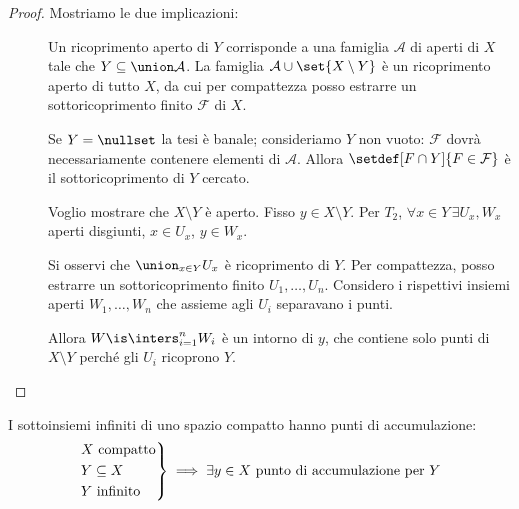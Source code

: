 \begin{proof}
Mostriamo le due implicazioni:
\begin{description}
	\item[\proofleftarrow]
		Un ricoprimento aperto di $Y$ corrisponde a una famiglia  $\mathcal A$ di aperti di $X$ tale che $Y\subseteq \union\mathcal A$.
  La famiglia $\mathcal A \cup \set{X\setminus Y}$ è un ricoprimento aperto di tutto $X$,
		da cui per compattezza posso estrarre un sottoricoprimento finito $\mathcal F$ di $X$.
  
  Se $Y=\nullset$ la tesi è banale; consideriamo $Y$ non vuoto:
  $\mathcal F$ dovrà necessariamente contenere elementi di $\mathcal A$.
  Allora $\setdef[F\cap Y]{F\in\mathcal F}$ è il sottoricoprimento di $Y$ cercato.\footnotemark
 \item[\proofrightarrow]
		Voglio mostrare che $X\setminus Y$ è aperto.
		Fisso $y\in X\setminus Y$.
  Per $T_2$, $\forall x\in Y\, \exists U_x, W_x$ aperti disgiunti, $x\in U_x$, $y\in W_x$.
		
		Si osservi che $\union_{x\in Y}U_x$ è ricoprimento di $Y$. Per compattezza, posso estrarre un sottoricoprimento finito $U_1,\dots, U_n$.
		Considero i rispettivi insiemi aperti $W_1,\dots, W_n$ che assieme agli $U_i$ separavano i punti.
  
		Allora $W\is \inters_{i=1}^nW_i$ è un intorno di $y$,
  che contiene solo punti di $X\setminus Y$ perché gli $U_i$ ricoprono $Y$.
  \qedhere
	\end{description}
\end{proof}


\begin{lemma}
 \label{th:infcompacc}
 I sottoinsiemi infiniti di uno spazio compatto hanno punti di accumulazione:
 \[\begin{rcases}
  \text{$X$ compatto} \\
  Y\subseteq X \\
  \text{$Y$ infinito}
 \end{rcases}\implies
 \exists y\in X\text{ punto di accumulazione per }Y\]
\end{lemma}

